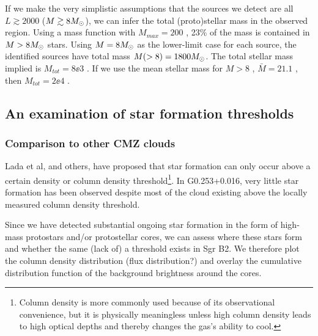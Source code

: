 \documentclass{emulateapj}
\newcommand{\ncores}{138\xspace}
\begin{document}
If we make the very simplistic assumptions that the sources we detect are all
$L\gtrsim2000$ \lsun ($M\gtrsim8 M_{\odot}$), 
we can infer the total (proto)stellar mass in the observed region.
Using a \citet{Kroupa2001a} mass function with $M_{max}=200$ \msun, 23\% of
the mass is contained in $M>8M_{\odot}$ stars.  Using $M=8M_{\odot}$ as the lower-limit
case for each source, the identified sources have total mass $M(>8)=1800M_{\odot}$.
The total stellar mass implied is $M_{tot} = 8\ee{3}$ \msun.  If we use the
mean stellar mass for $M>8$ \msun, $\bar{M}=21.1$ \msun, then $M_{tot}=2\ee{4}$
\msun.





% 

\subsection{An examination of star formation thresholds}
\subsubsection{Comparison to other CMZ clouds}
Lada et al, and others, have proposed that star formation can only occur above
a certain density or column density threshold\footnote{Column density is more
commonly used because of its observational convenience, but it is physically
meaningless unless high column density leads to high optical depths and thereby
changes the gas's ability to cool.}.  In G0.253+0.016, very little star formation
has been observed \citep{Longmore2013a,Johnston2014a,Rathborne2015a} despite
most of the cloud existing above the locally measured column density threshold.

Since we have detected substantial ongoing star formation in the form of
high-mass protostars and/or protostellar cores, we can assess where these stars
form and whether the same (lack of) a threshold exists in Sgr B2.  We therefore
plot the column density distribution (flux distribution?) and overlay the
cumulative distribution function of the background brightness around the cores.
\end{document}
